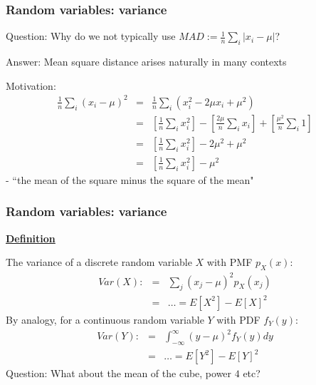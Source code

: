 \documentclass[t,8pt]{beamer}%
\begin{document}
	\begin{frame}
		\frametitle{Random variables: variance}
		Question: Why do we not typically use $MAD:=\frac 1n\sum_i|x_i-\mu |$? \par 
		Answer: Mean square distance arises naturally in many contexts \par 
		Motivation:
		\begin{eqnarray*}
			\frac 1n\sum_i(x_i-\mu)^2&=&\frac 1n\sum_i(x_i^2-2\mu x_i+\mu^2) \\
			&=&\left[\frac 1n\sum_ix_i^2\right]-\left[\frac{2\mu}n\sum_ix_i\right]+\left[\frac{\mu^2}n\sum_i1\right] \\
			&=&\left[\frac 1n\sum_ix_i^2\right]-2\mu^2+\mu^2 \\
			&=&\left[\frac 1n\sum_ix_i^2\right]-\mu^2 
		\end{eqnarray*}
		- ``the mean of the square minus the square of the mean"
	\end{frame}
	
	\begin{frame}
		\frametitle{Random variables: variance}
		{\bf\underline{Definition}} \par
		The variance of a discrete random variable $X$ with PMF $p_X(x)$:
		\begin{eqnarray*}
			Var(X):&=&\sum_j(x_j-\mu)^2p_X(x_j) \\
			&=&\dots =E[X^2]-E[X]^2 
		\end{eqnarray*}
		By analogy, for a continuous random variable $Y$ with PDF $f_Y(y)$:
		\begin{eqnarray*}
			Var(Y):&=&\int_{-\infty}^{\infty}(y-\mu)^2f_Y(y)dy \\
			&=&\dots =E[Y^2]-E[Y]^2 
		\end{eqnarray*}
		Question: What about the mean of the cube, power $4$ etc?
	\end{frame}
	
\end{document}
